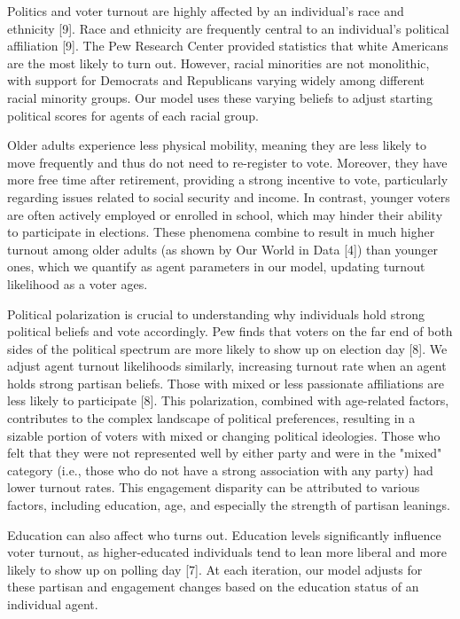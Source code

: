\documentclass[titlepage, 12pt, leqno]{article} %
\begin{document}
Politics and voter turnout are highly affected by an individual's race
and ethnicity [9]. Race and ethnicity are frequently central to an individual's
political affiliation [9]. The Pew Research Center provided statistics that 
white Americans are the most likely to turn out. However, racial minorities are
not monolithic, with support for Democrats and Republicans varying widely among
different racial minority groups. Our model uses these varying beliefs to adjust
starting political scores for agents of each racial group.

Older adults experience less physical mobility, meaning they are less
likely to move frequently and thus do not need to re-register to vote. Moreover,
they have more free time after retirement, providing a strong incentive to vote,
particularly regarding issues related to social security and income. In 
contrast, younger voters are often actively employed or enrolled in school, 
which may hinder their ability to participate in elections. These phenomena
combine to result in much higher turnout among older adults (as shown by Our
World in Data [4]) than younger ones, which we quantify as agent parameters in
our model, updating turnout likelihood as a voter ages.

Political polarization is crucial to understanding why individuals hold strong
political beliefs and vote accordingly. Pew finds that voters on the far end of
both sides of the political spectrum are more likely to show up on election day
[8]. We adjust agent turnout likelihoods similarly, increasing turnout rate when
an agent holds strong partisan beliefs. Those with mixed or less passionate
affiliations are less likely to participate [8]. This polarization, combined 
with age-related factors, contributes to the complex landscape of political
preferences, resulting in a sizable portion of voters with mixed or changing
political ideologies. Those who felt that they were not represented well by
either party and were in the "mixed" category (i.e., those who do not have a
strong association with any party) had lower turnout rates. This engagement
disparity can be attributed to various factors, including education, age, and
especially the strength of partisan leanings.

Education can also affect who turns out. Education levels significantly 
influence voter turnout, as higher-educated individuals tend to lean more 
liberal and more likely to show up on polling day [7]. At each iteration, our
model adjusts for these partisan and engagement changes based on the education
status of an individual agent.
\end{document}
